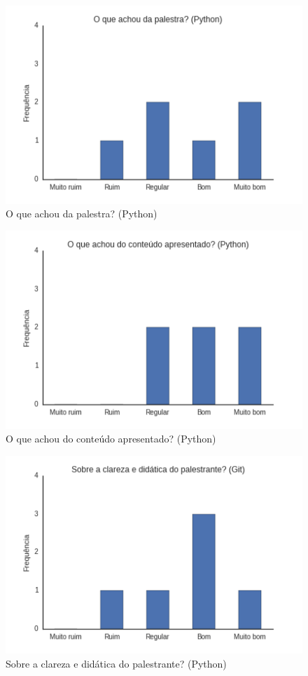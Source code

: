 \documentclass[12pt]{article}
\begin{document}
\begin{figure}[p]
    \centering
    \includegraphics[scale=0.6]{images/python1.png}
    \caption{\label{fig:python1}O que achou da palestra? (Python)}
\end{figure}

\begin{figure}[p]
    \centering
    \includegraphics[scale=0.6]{images/python2.png}
    \caption{\label{fig:python2}O que achou do conteúdo apresentado? (Python)}
\end{figure}

\begin{figure}[p]
    \centering
    \includegraphics[scale=0.6]{images/python3.png}
    \caption{\label{fig:python3}Sobre a clareza e didática do palestrante? (Python)}
\end{figure}
\end{document}
